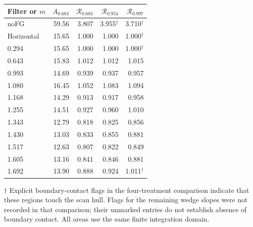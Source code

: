 \begin{supptable}
\centering
\caption{Joint areas and area ratios for the adopted smoothed weights. $A_{0.683}$ is in units of $10^{-4}$; each $\mathcal R_f$ is relative to the horizontal cut at the same weight fraction. All eleven wedge cases are retained. Areas remain conditional on the common finite scan domain; boundary contact is recorded in the accompanying CSV tables.}
\label{tab:sareas}
\begin{tabular}{@{}lrrrr@{}}
\toprule
Filter or $m$ & $A_{0.683}$ & $\mathcal R_{0.683}$ & $\mathcal R_{0.954}$ & $\mathcal R_{0.997}$ \\
\midrule
noFG & 59.56 & 3.807 & 3.955$^\dagger$ & 3.710$^\dagger$ \\
Horizontal & 15.65 & 1.000 & 1.000 & 1.000$^\dagger$ \\
0.294 & 15.65 & 1.000 & 1.000 & 1.000$^\dagger$ \\
0.643 & 15.83 & 1.012 & 1.012 & 1.015 \\
0.993 & 14.69 & 0.939 & 0.937 & 0.957 \\
1.080 & 16.45 & 1.052 & 1.083 & 1.094 \\
1.168 & 14.29 & 0.913 & 0.917 & 0.958 \\
1.255 & 14.51 & 0.927 & 0.960 & 1.010 \\
1.343 & 12.79 & 0.818 & 0.825 & 0.856 \\
1.430 & 13.03 & 0.833 & 0.855 & 0.881 \\
1.517 & 12.63 & 0.807 & 0.822 & 0.849 \\
1.605 & 13.16 & 0.841 & 0.846 & 0.881 \\
1.692 & 13.90 & 0.888 & 0.924 & 1.011$^\dagger$ \\
\bottomrule
\end{tabular}
\par\smallskip\begin{minipage}{.95\textwidth}\small
$\dagger$ Explicit boundary-contact flags in the four-treatment comparison indicate that these regions touch the scan hull. Flags for the remaining wedge slopes were not recorded in that comparison; their unmarked entries do not establish absence of boundary contact. All areas use the same finite integration domain.
\end{minipage}
\end{supptable}